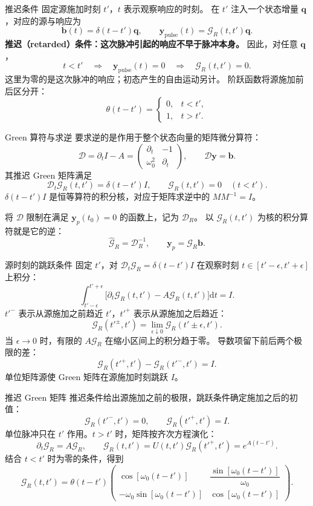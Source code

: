 \documentclass[aspectratio=169,11pt]{beamer}
\newcommand{\dd}{\mathrm d}
\begin{document}
\begin{frame}{推迟条件}
固定源施加时刻 $t'$，$t$ 表示观察响应的时刻。
在 $t'$ 注入一个状态增量 $\bm q$，对应的源与响应为
\[
\bm b(t)=\delta(t-t')\bm q,\qquad
\bm y_{\mathrm{pulse}}(t)=\mathcal G_R(t,t')\bm q.
\]
\textbf{推迟（retarded）条件：这次脉冲引起的响应不早于脉冲本身。}
因此，对任意 $\bm q$，
\[
t<t'\quad\Longrightarrow\quad
\bm y_{\mathrm{pulse}}(t)=0
\quad\Longrightarrow\quad \mathcal G_R(t,t')=0.
\]
这里为零的是这次脉冲的响应；初态产生的自由运动另计。
阶跃函数将源施加前后区分开：
\[
\theta(t-t')=\begin{cases}0,&t<t',\\1,&t>t'.\end{cases}
\]
\end{frame}

\begin{frame}{Green 算符与求逆}
要求逆的是作用于整个状态向量的矩阵微分算符：
\[
\mathcal D=\partial_t I-A
=\begin{pmatrix}\partial_t&-1\\\omega_0^2&\partial_t\end{pmatrix},
\qquad \mathcal D\bm y=\bm b.
\]
其推迟 Green 矩阵满足
\[
\mathcal D_t\mathcal G_R(t,t')=\delta(t-t')I,
\qquad \mathcal G_R(t,t')=0\quad(t<t').
\]
$\delta(t-t')I$ 是恒等算符的积分核，对应于矩阵求逆中的 $MM^{-1}=I$。
\medskip

将 $\mathcal D$ 限制在满足 $\bm y_p(t_0)=0$ 的函数上，记为 $\mathcal D_R$。
以 $\mathcal G_R(t,t')$ 为核的积分算符就是它的逆：
\[
\boxed{\widehat{\mathcal G}_R=\mathcal D_R^{-1}},\qquad
\bm y_p=\widehat{\mathcal G}_R\bm b.
\]
\end{frame}

\begin{frame}{源时刻的跳跃条件}
固定 $t'$，对 $\mathcal D_t\mathcal G_R=\delta(t-t')I$
在观察时刻 $t\in[t'-\epsilon,t'+\epsilon]$ 上积分：
\[
\int_{t'-\epsilon}^{t'+\epsilon}
\bigl[\partial_t\mathcal G_R(t,t')-A\mathcal G_R(t,t')\bigr]\dd t=I.
\]
$t'^-$ 表示从源施加之前趋近 $t'$，$t'^+$ 表示从源施加之后趋近：
\[
\mathcal G_R(t'^\pm,t')
=\lim_{\epsilon\downarrow0}\mathcal G_R(t'\pm\epsilon,t').
\]
当 $\epsilon\to0$ 时，有限的 $A\mathcal G_R$ 在缩小区间上的积分趋于零。
导数项留下前后两个极限的差：
\[
\boxed{\mathcal G_R(t'^+,t')-\mathcal G_R(t'^-,t')=I}.
\]
单位矩阵源使 Green 矩阵在源施加时刻跳跃 $I$。
\end{frame}

\begin{frame}{推迟 Green 矩阵}
推迟条件给出源施加之前的极限，跳跃条件确定施加之后的初值：
\[
\mathcal G_R(t'^-,t')=0,\qquad
\mathcal G_R(t'^+,t')=I.
\]
单位脉冲只在 $t'$ 作用。$t>t'$ 时，矩阵按齐次方程演化：
\[
\partial_t\mathcal G_R=A\mathcal G_R,\qquad
\mathcal G_R(t,t')=U(t,t')\mathcal G_R(t'^+,t')=e^{A(t-t')}.
\]
结合 $t<t'$ 时为零的条件，得到
\[
\mathcal G_R(t,t')=\theta(t-t')\begin{pmatrix}
\cos[\omega_0(t-t')] & \dfrac{\sin[\omega_0(t-t')]}{\omega_0}\\[0.5em]
-\omega_0\sin[\omega_0(t-t')] & \cos[\omega_0(t-t')]
\end{pmatrix}.
\]
\end{frame}
\end{document}

